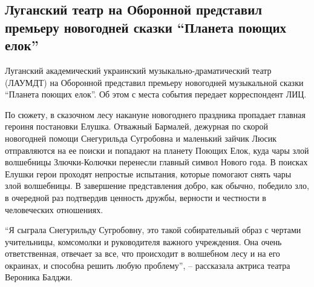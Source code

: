  
 
 
 
 
\subsection{Луганский театр на Оборонной представил премьеру новогодней сказки \enquote{Планета поющих елок}}
\label{sec:18_12_2021.stz.news.lnr.lug_info.2.skazka_premjera}


Луганский академический украинский музыкально-драматический театр (ЛАУМДТ) на
Оборонной представил премьеру новогодней музыкальной сказки \enquote{Планета поющих
елок}. Об этом с места события передает корреспондент ЛИЦ.


По сюжету, в сказочном лесу накануне новогоднего праздника пропадает главная
героиня постановки Елушка. Отважный Бармалей, дежурная по скорой новогодней
помощи Снегурильда Сугробовна и маленький зайчик Люсик отправляются на ее
поиски и попадают на планету Поющих Елок, куда чары злой волшебницы
Злючки-Колючки перенесли главный символ Нового года. В поисках Елушки герои
проходят непростые испытания, которые помогают снять чары злой волшебницы. В
завершение представления добро, как обычно, победило зло, в очередной раз
подтвердив ценность дружбы, верности и честности в человеческих отношениях.


\enquote{Я сыграла Снегурильду Сугробовну, это такой собирательный образ с чертами
учительницы, комсомолки и руководителя важного учреждения. Она очень
ответственная, отвечает за все, что происходит в волшебном лесу и на его
окраинах, и способна решить любую проблему}, – рассказала актриса театра
Вероника Балджи.


